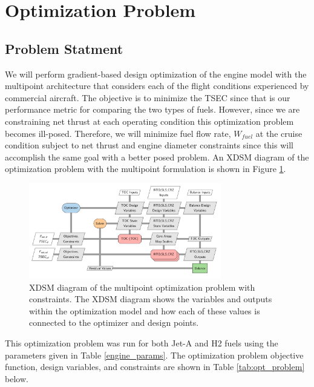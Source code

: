 \documentclass[conf]{new-aiaa}
\begin{document}
\section{Optimization Problem}
\label{sec:optprob}

\subsection{Problem Statment}
We will perform gradient-based design optimization of the engine model with the multipoint architecture that considers each of the flight conditions experienced by commercial aircraft.
The objective is to minimize the TSEC since that is our performance metric for comparing the two types of fuels.
However, since we are constraining net thrust at each operating condition this optimization problem becomes ill-posed.
Therefore, we will minimize fuel flow rate, $W_{fuel}$ at the cruise condition subject to net thrust and engine diameter constraints since this will accomplish the same goal with a better posed problem.
An XDSM diagram of the optimization problem with the multipoint formulation is shown in Figure \ref{fig:N3_xdsm_opt}.

\begin{figure}[!hbt]
    \centering
    \includegraphics[width=0.75\textwidth]{N3_xdsm_opt.pdf}
    \caption{
        XDSM diagram of the multipoint optimization problem with constraints.
        The XDSM diagram shows the variables and outputs within the optimization model and how each of these values is connected to the optimizer and design points.}
    \label{fig:N3_xdsm_opt}
\end{figure}

This optimization problem was run for both Jet-A and H2 fuels using the parameters given in Table \ref{engine_params}.
The optimization problem objective function, design variables, and constraints are shown in Table \ref{tab:opt_problem} below.
\end{document}
